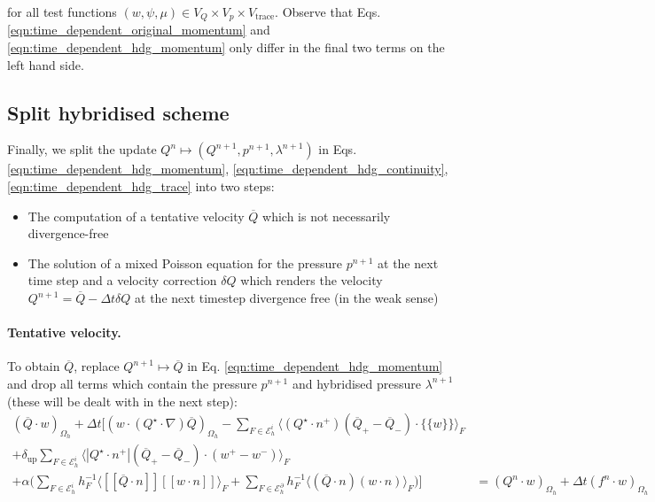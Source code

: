 \documentclass[11pt]{article}
\newcommand{\jump}[1]{[\![ #1]\!]}
\newcommand{\avg}[1]{\{\!\{#1\}\!\}}
\begin{document}
for all test functions $(w,\psi,\mu) \in V_Q\times V_p\times V_{\text{trace}}$. Observe that Eqs. \eqref{eqn:time_dependent_original_momentum} and \eqref{eqn:time_dependent_hdg_momentum} only differ in the final two terms on the left hand side.
\subsection{Split hybridised scheme}\label{sec:split_hybridised}
Finally, we split the update $Q^{n} \mapsto (Q^{n+1},p^{n+1},\lambda^{n+1})$ in Eqs. \eqref{eqn:time_dependent_hdg_momentum}, \eqref{eqn:time_dependent_hdg_continuity}, \eqref{eqn:time_dependent_hdg_trace} into two steps:
\begin{itemize}
    \item The computation of a tentative velocity $\overline{Q}$ which is not necessarily divergence-free
    \item The solution of a mixed Poisson equation for the pressure $p^{n+1}$ at the next time step and a velocity correction $\delta Q$ which renders the velocity $Q^{n+1} = \overline{Q}-\Delta t \delta Q$ at the next timestep divergence free (in the weak sense)
\end{itemize}
\paragraph{Tentative velocity.}
To obtain $\overline{Q}$, replace $Q^{n+1} \mapsto \overline{Q}$ in Eq. \eqref{eqn:time_dependent_hdg_momentum} and drop all terms which contain the pressure $p^{n+1}$ and hybridised pressure $\lambda^{n+1}$ (these will be dealt with in the next step):
\begin{equation}
    \begin{aligned}
        (\overline{Q}\cdot w)_{\Omega_h} + \Delta t\Big[  \left(w\cdot (Q^\star\cdot \nabla) \overline{Q}\right)_{\Omega_h}  -\sum_{F\in\mathcal{E}_h^i} \langle (Q^\star \cdot n^+)(\overline{Q}_+ - \overline{Q}_-)\cdot \avg{w}\rangle_F & \\
        +\delta_{\text{up}}\sum_{F\in\mathcal{E}_h^i} \langle \left|Q^\star \cdot n^+\right|(\overline{Q}_+ - \overline{Q}_-)\cdot (w^+-w^-)\rangle_F                                                                                       & \\+ \alpha \Big(\sum_{F\in\mathcal{E}_h^i} h_F^{-1}\langle \jump{\overline{Q}\cdot n} \jump{w\cdot n}\rangle_F                                      +  \sum_{F\in\mathcal{E}_h^\partial} h_F^{-1}\langle (\overline{Q}\cdot n) (w\cdot n)\rangle_F \Big)  \Big]          & = (Q^n\cdot w)_{\Omega_h} + \Delta t (f^n\cdot w)_{\Omega_h}
    \end{aligned}\label{eqn:tentative_velocity}
\end{equation}
\end{document}

